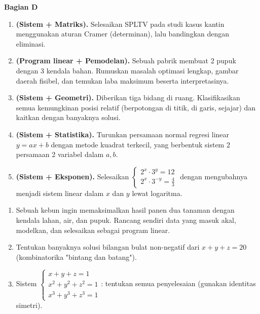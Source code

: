 \documentclass[11pt,a4paper]{report}
\theoremstyle{gaya}
\newcommand{\bagiansoal}[2]{%
  \par\medskip\noindent
  {\large\bfseries\color{biru}Bagian #1}\par\smallskip
  \addcontentsline{toc}{subsection}{Bagian #1}}
\begin{document}
\bagiansoal{D}{Expert (setara tahun pertama universitas --- sintesis antarbab)}
\begin{enumerate}[leftmargin=*]
  \item \textbf{(Sistem + Matriks).} Selesaikan SPLTV pada studi kasus kantin menggunakan aturan Cramer (determinan), lalu bandingkan dengan eliminasi.
  \item \textbf{(Program linear + Pemodelan).} Sebuah pabrik membuat 2 pupuk dengan 3 kendala bahan. Rumuskan masalah optimasi lengkap, gambar daerah fisibel, dan temukan laba maksimum beserta interpretasinya.
  \item \textbf{(Sistem + Geometri).} Diberikan tiga bidang di ruang. Klasifikasikan semua kemungkinan posisi relatif (berpotongan di titik, di garis, sejajar) dan kaitkan dengan banyaknya solusi.
  \item \textbf{(Sistem + Statistika).} Turunkan persamaan normal regresi linear $y=ax+b$ dengan metode kuadrat terkecil, yang berbentuk sistem 2 persamaan 2 variabel dalam $a,b$.
  \item \textbf{(Sistem + Eksponen).} Selesaikan $\begin{cases} 2^x\cdot 3^y=12\\ 2^x\cdot 3^{-y}=\tfrac43\end{cases}$ dengan mengubahnya menjadi sistem linear dalam $x$ dan $y$ lewat logaritma.
\end{enumerate}

\begin{challenge}
\begin{enumerate}[leftmargin=*,topsep=2pt]
  \item Sebuah kebun ingin memaksimalkan hasil panen dua tanaman dengan kendala lahan, air, dan pupuk. Rancang sendiri data yang masuk akal, modelkan, dan selesaikan sebagai program linear.
  \item Tentukan banyaknya solusi bilangan bulat non-negatif dari $x+y+z=20$ (kombinatorika "bintang dan batang").
  \item Sistem $\begin{cases} x+y+z=1\\ x^2+y^2+z^2=1\\ x^3+y^3+z^3=1\end{cases}$: tentukan semua penyelesaian (gunakan identitas simetri).
\end{enumerate}
\end{challenge}

\end{document}
